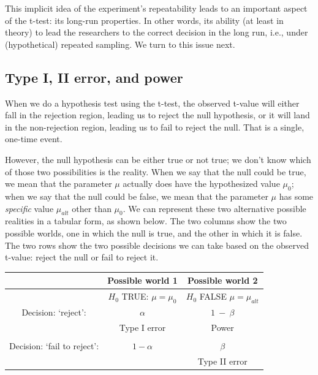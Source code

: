 \documentclass[12pt,]{krantz}
\begin{document}
This implicit idea of the experiment's repeatability leads to an important aspect of the t-test: its long-run properties. In other words, its ability (at least in theory) to lead the researchers to the correct decision in the long run, i.e., under (hypothetical) repeated sampling. We turn to this issue next.

\hypertarget{type-i-ii-error-and-power}{%
\subsection{Type I, II error, and power}\label{type-i-ii-error-and-power}}

When we do a hypothesis test using the t-test, the observed t-value will either fall in the rejection region, leading us to reject the null hypothesis,
or it will land in the non-rejection region, leading us to fail to reject the null. That is a single, one-time event.

However, the null hypothesis can be either true or not true; we don't know which of those two possibilities is the reality.
When we say that the null could be true, we mean that the parameter \(\mu\) actually does have the hypothesized value \(\mu_0\); when we say that the null could be false, we mean that the parameter \(\mu\) has some \emph{specific} value \(\mu_{alt}\) other than \(\mu_0\).
We can represent these two alternative possible realities in a tabular form, as shown below. The two columns show the two possible worlds, one in which the null is true, and the other in which it is false. The two rows show the two possible decisions we can take based on the observed t-value: reject the null or fail to reject it.

\begin{tabular}{ccc}
        & \textbf{Possible world 1}      & \textbf{Possible world 2} \\  
\hline
 & $H_0$ TRUE: $\mu=\mu_0$  & $H_0$ FALSE $\mu=\mu_{alt}$ \\
\hline
Decision: `reject': & $\alpha$ & $1~-~\beta$ \\
                                     & Type I error                         & Power \\                                      
                                     & & \\
\hline
Decision: `fail to reject': & $1 - \alpha$ & $\beta$ \\                                    &                                 & Type II error\\
\hline
\end{tabular}
\end{document}
